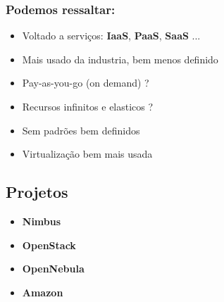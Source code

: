 \documentclass[10pt]{beamer}
\begin{document}
		\begin{frame}%
		\frametitle{Podemos ressaltar:}
			\begin{itemize}%
				\item Voltado a serviços: \textbf{IaaS}, \textbf{PaaS}, \textbf{SaaS} ...
				\item Mais usado da industria, bem menos definido
				\item Pay-as-you-go (on demand) ?
				\item Recursos infinitos e elasticos ?
				\item Sem padrões bem definidos
				\item Virtualização bem mais usada
			\end{itemize}
		\end{frame}

	\subsection{Projetos}

		\begin{frame}%
			\begin{itemize}%
				\item \textbf{Nimbus}
				\item \textbf{OpenStack}
				\item \textbf{OpenNebula}
				\item \textbf{Amazon}
			\end{itemize}
		\end{frame}
\end{document}

